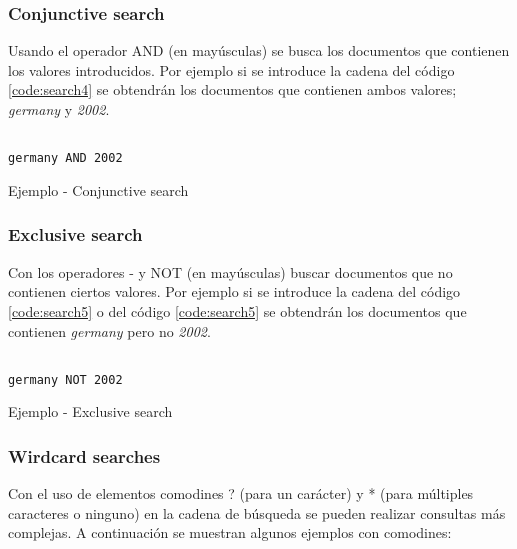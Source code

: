 \subsubsection{Conjunctive search}
Usando el operador AND (en mayúsculas) se busca los documentos que contienen los valores introducidos. Por ejemplo si se introduce la cadena del código \ref{code:search4} se obtendrán los documentos que contienen ambos valores; \textit{germany} y \textit{2002}.
\begin{listing}[H]
\begin{verbatim}
	
germany AND 2002
\end{verbatim}
	\caption{Ejemplo - Conjunctive search}
	\label{code:search4}
\end{listing}

\subsubsection{Exclusive search}
Con los operadores - y NOT (en mayúsculas) buscar documentos que no contienen ciertos valores. Por ejemplo si se introduce la cadena del código \ref{code:search5} o del código \ref{code:search5} se obtendrán los documentos que contienen \textit{germany} pero no \textit{2002}.
\begin{listing}[H]
\begin{verbatim}
	
germany NOT 2002
\end{verbatim}
	\caption{Ejemplo - Exclusive search}
	\label{code:search5}
\end{listing}

\subsubsection{Wirdcard searches}
Con el uso de elementos comodines ? (para un carácter) y * (para múltiples caracteres o ninguno) en la cadena de búsqueda se pueden realizar consultas más complejas. A continuación se muestran algunos ejemplos con comodines:

